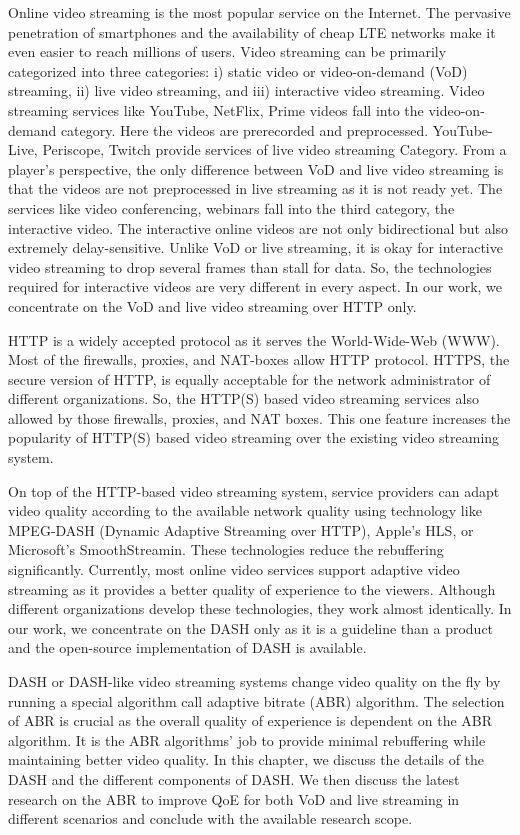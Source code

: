 Online video streaming is the most popular service on the Internet. The pervasive penetration of smartphones and the availability of cheap LTE networks make it even easier to reach millions of users. Video streaming can be primarily categorized into three categories: i) static video or video-on-demand (VoD) streaming, ii) live video streaming, and iii) interactive video streaming. Video streaming services like YouTube, NetFlix, Prime videos fall into the video-on-demand category. Here the videos are prerecorded and preprocessed. YouTube-Live, Periscope, Twitch provide services of live video streaming Category. From a player's perspective, the only difference between VoD and live video streaming is that the videos are not preprocessed in live streaming as it is not ready yet. The services like video conferencing, webinars fall into the third category, the interactive video. The interactive online videos are not only bidirectional but also extremely delay-sensitive. Unlike VoD or live streaming, it is okay for interactive video streaming to drop several frames than stall for data. So, the technologies required for interactive videos are very different in every aspect. In our work, we concentrate on the VoD and live video streaming over HTTP only.

HTTP is a widely accepted protocol as it serves the World-Wide-Web (WWW). Most of the firewalls, proxies, and NAT-boxes allow HTTP protocol. HTTPS, the secure version of HTTP, is equally acceptable for the network administrator of different organizations. So, the HTTP(S) based video streaming services also allowed by those firewalls, proxies, and NAT boxes. This one feature increases the popularity of HTTP(S) based video streaming over the existing video streaming system.

On top of the HTTP-based video streaming system, service providers can adapt video quality according to the available network quality using technology like MPEG-DASH (Dynamic Adaptive Streaming over HTTP), Apple's HLS, or Microsoft's SmoothStreamin. These technologies reduce the rebuffering significantly. Currently, most online video services support adaptive video streaming as it provides a better quality of experience to the viewers. Although different organizations develop these technologies, they work almost identically. In our work, we concentrate on the DASH only as it is a guideline than a product and the open-source implementation of DASH is available.

DASH or DASH-like video streaming systems change video quality on the fly by running a special algorithm call adaptive bitrate (ABR) algorithm. The selection of ABR is crucial as the overall quality of experience is dependent on the ABR algorithm. It is the ABR algorithms' job to provide minimal rebuffering while maintaining better video quality. In this chapter, we discuss the details of the DASH and the different components of DASH.  We then discuss the latest research on the ABR to improve QoE for both VoD and live streaming in different scenarios and conclude with the available research scope.

